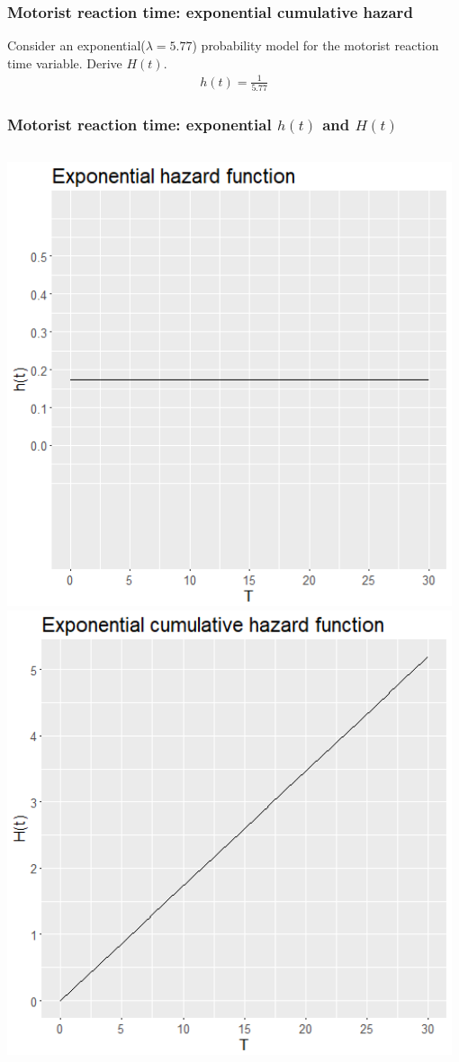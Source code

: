 \begin{frame}
\frametitle{Motorist reaction time: exponential cumulative hazard}
Consider an exponential($\lambda=5.77$) probability model for the motorist reaction time variable.  Derive $H(t)$.
\begin{eqnarray}
h(t)= \frac{1}{5.77} \nonumber
\end{eqnarray}
\vskip200pt
\end{frame}

\begin{frame}
\frametitle{Motorist reaction time: exponential $h(t)$ and $H(t)$}
\begin{columns}
\includegraphics[width=0.98\textwidth]{Figures/motorist_haz_exp.png}
\includegraphics[width=0.98\textwidth]{Figures/motorist_cum_haz_exp.png}

\end{columns}
\end{frame}
